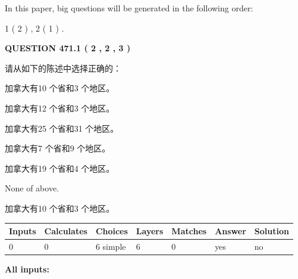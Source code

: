 \documentclass{ctexart}
\begin{document}
   
   
\vspace{0.2in}
   
In this paper, big questions will be generated in the following order: 
   
   
   1 ( 2 )
 ,
   2 ( 1 )
 .
  
\vspace{0.2in}
  
{\textbf{\Large{QUESTION
471.1 
 ( 2 , 2 , 3 )
}}}
  
  
请从如下的陈述中选择正确的：
 
 
加拿大有10 个省和3 个地区。
 
 
加拿大有12 个省和3 个地区。
 
 
加拿大有25 个省和31 个地区。
 
 
加拿大有7 个省和9 个地区。
 
 
加拿大有19 个省和4 个地区。
 
 
 None of above.
 
 
\noindent{}
 
 
加拿大有10 个省和3 个地区。
 
 
\noindent{}
 
 
   
   
   
   
\noindent\begin{tabular}{|l|l|l|l|l|l|l|}
 \hline
Inputs & Calculates & Choices & Layers & Matches & Answer & Solution \\ \hline
 0  & 
 0  & 
 6
  simple  
  & 
 6  & 
 0  & 
  yes & 
  no 
  \\ \hline
 \end{tabular}
   
   
   
   
\noindent{}
   
   
   
   
\noindent\vspace{0.1in}\hspace{-0.08in} {\textbf{\Large{All inputs: }}}
   
\end{document}
